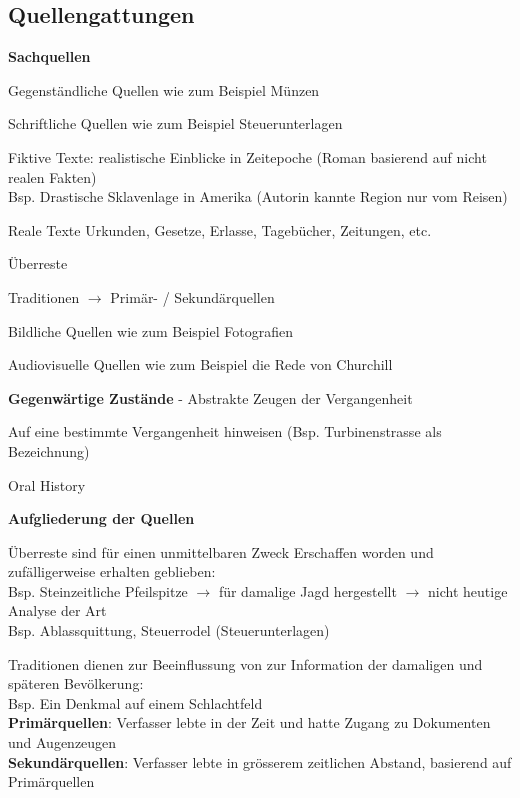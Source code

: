 \documentclass[10pt, openright=true]{scrartcl}
\begin{document}
\subsection{Quellengattungen}
\textbf{Sachquellen}\\ \vspace{-0.5cm}
\begin{citemize}
 \item Gegenständliche Quellen wie zum Beispiel Münzen
 \item Schriftliche Quellen wie zum Beispiel Steuerunterlagen
 \begin{citemize}
 \item Fiktive Texte: realistische Einblicke in Zeitepoche (Roman basierend auf nicht realen Fakten) \\ Bsp. Drastische Sklavenlage in Amerika (Autorin kannte Region nur vom Reisen)
 \item Reale Texte Urkunden, Gesetze, Erlasse, Tagebücher, Zeitungen, etc.
 \begin{citemize}
 \item Überreste
 \item Traditionen $ \rightarrow $ Primär- / Sekundärquellen
 \end{citemize}
 \end{citemize}
 \item Bildliche Quellen wie zum Beispiel Fotografien
 \item Audiovisuelle Quellen wie zum Beispiel die Rede von Churchill \vspace{0.2cm}
\end{citemize}
\textbf{Gegenwärtige Zustände} - Abstrakte Zeugen der Vergangenheit\\ \vspace{-0.2cm}
 \begin{citemize}
 \item Auf eine bestimmte Vergangenheit hinweisen (Bsp. Turbinenstrasse als Bezeichnung)
 \item Oral History \vspace{0.2cm}
 \end{citemize}
\textbf{Aufgliederung der Quellen}\\ \vspace{-0.2cm}
 \begin{citemize}
 \item Überreste sind für einen unmittelbaren Zweck Erschaffen worden und zufälligerweise erhalten geblieben: \\  Bsp. Steinzeitliche Pfeilspitze $ \rightarrow $ für damalige Jagd hergestellt $ \rightarrow $ nicht heutige Analyse der Art\\ Bsp. Ablassquittung, Steuerrodel (Steuerunterlagen)
 \item Traditionen dienen zur Beeinflussung von zur Information der damaligen und späteren Bevölkerung:\\ Bsp. Ein Denkmal auf einem Schlachtfeld \\ \textbf{Primärquellen}: Verfasser lebte in der Zeit und hatte Zugang zu Dokumenten und Augenzeugen \\ \textbf{Sekundärquellen}: Verfasser lebte in grösserem zeitlichen Abstand, basierend auf Primärquellen \vspace{-0.25cm}
 \end{citemize}
\end{document}
